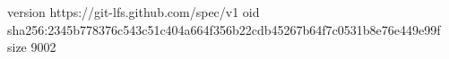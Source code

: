 version https://git-lfs.github.com/spec/v1
oid sha256:2345b778376c543c51c404a664f356b22cdb45267b64f7c0531b8e76e449e99f
size 9002
